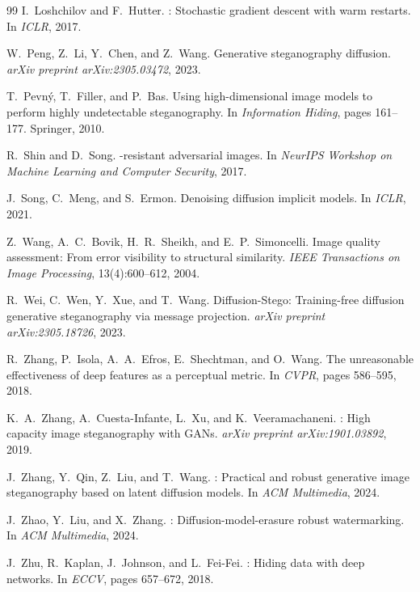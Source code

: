 \documentclass[10pt, twocolumn]{article}
\begin{document}
\begin{thebibliography}{99}
I.~Loshchilov and F.~Hutter.
: Stochastic gradient descent with warm restarts.
\newblock In \emph{ICLR}, 2017.

W.~Peng, Z.~Li, Y.~Chen, and Z.~Wang.
\newblock Generative steganography diffusion.
\newblock \emph{arXiv preprint arXiv:2305.03472}, 2023.

T.~Pevn{\'y}, T.~Filler, and P.~Bas.
\newblock Using high-dimensional image models to perform highly undetectable steganography.
\newblock In \emph{Information Hiding}, pages 161--177. Springer, 2010.

R.~Shin and D.~Song.
-resistant adversarial images.
\newblock In \emph{NeurIPS Workshop on Machine Learning and Computer Security}, 2017.

J.~Song, C.~Meng, and S.~Ermon.
\newblock Denoising diffusion implicit models.
\newblock In \emph{ICLR}, 2021.

Z.~Wang, A.~C.~Bovik, H.~R.~Sheikh, and E.~P.~Simoncelli.
\newblock Image quality assessment: From error visibility to structural similarity.
\newblock \emph{IEEE Transactions on Image Processing}, 13(4):600--612, 2004.

R.~Wei, C.~Wen, Y.~Xue, and T.~Wang.
\newblock Diffusion-Stego: Training-free diffusion generative steganography via message projection.
\newblock \emph{arXiv preprint arXiv:2305.18726}, 2023.

R.~Zhang, P.~Isola, A.~A.~Efros, E.~Shechtman, and O.~Wang.
\newblock The unreasonable effectiveness of deep features as a perceptual metric.
\newblock In \emph{CVPR}, pages 586--595, 2018.

K.~A.~Zhang, A.~Cuesta-Infante, L.~Xu, and K.~Veeramachaneni.
: High capacity image steganography with {GANs}.
\newblock \emph{arXiv preprint arXiv:1901.03892}, 2019.

J.~Zhang, Y.~Qin, Z.~Liu, and T.~Wang.
: Practical and robust generative image steganography based on latent diffusion models.
\newblock In \emph{ACM Multimedia}, 2024.

J.~Zhao, Y.~Liu, and X.~Zhang.
: Diffusion-model-erasure robust watermarking.
\newblock In \emph{ACM Multimedia}, 2024.

J.~Zhu, R.~Kaplan, J.~Johnson, and L.~Fei-Fei.
: Hiding data with deep networks.
\newblock In \emph{ECCV}, pages 657--672, 2018.

\end{thebibliography}
\end{document}
